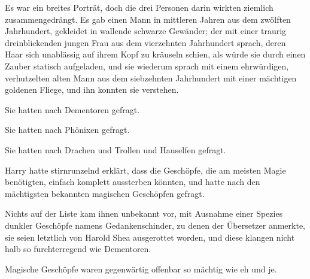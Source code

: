 Es war ein breites Porträt, doch die drei Personen darin wirkten ziemlich zusammengedrängt. Es gab einen Mann in mittleren Jahren aus dem zwölften Jahrhundert, gekleidet in wallende schwarze Gewänder; der mit einer traurig dreinblickenden jungen Frau aus dem vierzehnten Jahrhundert sprach, deren Haar sich unablässig auf ihrem Kopf zu kräuseln schien, als würde sie durch einen Zauber statisch aufgeladen, und sie wiederum sprach mit einem ehrwürdigen, verhutzelten alten Mann aus dem siebzehnten Jahrhundert mit einer mächtigen goldenen Fliege, und ihn konnten sie verstehen.

Sie hatten nach Dementoren gefragt.

Sie hatten nach Phönixen gefragt.

Sie hatten nach Drachen und Trollen und Hauselfen gefragt.

Harry hatte stirnrunzelnd erklärt, dass die Geschöpfe, die am meisten Magie benötigten, einfach komplett aussterben könnten, und hatte nach den mächtigsten bekannten magischen Geschöpfen gefragt.

Nichts auf der Liste kam ihnen unbekannt vor, mit Ausnahme einer Spezies dunkler Geschöpfe namens Gedankenschinder, zu denen der Übersetzer anmerkte, sie seien letztlich von Harold Shea ausgerottet worden, und diese klangen nicht halb so furchterregend wie Dementoren.

Magische Geschöpfe waren gegenwärtig offenbar so mächtig wie eh und je.

